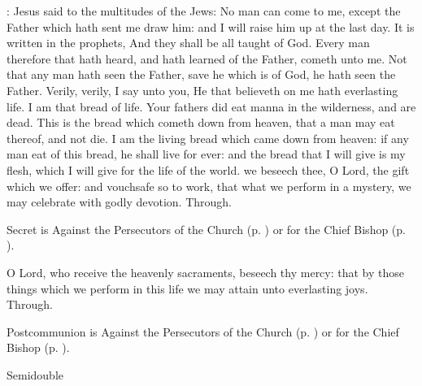 : Jesus said to the multitudes of the Jews: No man can come to me, except the Father which hath sent me draw him: and I will raise him up at the last day. It is written in the prophets, And they shall be all taught of God. Every man therefore that hath heard, and hath learned of the Father, cometh unto me. Not that any man hath seen the Father, save he which is of God, he hath seen the Father. Verily, verily, I say unto you, He that believeth on me hath everlasting life. I am that bread of life. Your fathers did eat manna in the wilderness, and are dead. This is the bread which cometh down from heaven, that a man may eat thereof, and not die. I am the living bread which came down from heaven: if any man eat of this bread, he shall live for ever: and the bread that I will give is my flesh, which I will give for the life of the world.
\secret
{} we beseech thee, O Lord, the gift which we offer: and vouchsafe so to work, that what we perform in a mystery, we may celebrate with godly devotion. Through.
\begin{rubric}
     Secret is Against the Persecutors of the Church (p. \pageref{SPAgainst}) or for the Chief Bishop (p. \pageref{SPChiefBishop}).
\end{rubric}
\postcommunion
{} O Lord, who receive the heavenly sacraments, beseech thy mercy: that by those things which we perform in this life we may attain unto everlasting joys. Through.
\begin{rubric}
     Postcommunion is Against the Persecutors of the Church (p. \pageref{SPAgainst}) or for the Chief Bishop (p. \pageref{SPChiefBishop}).
\end{rubric}

\begin{inhead}
    {Semidouble}
\end{inhead}
\fancyhead[RE,LO]{}
\par\noindent
{}

